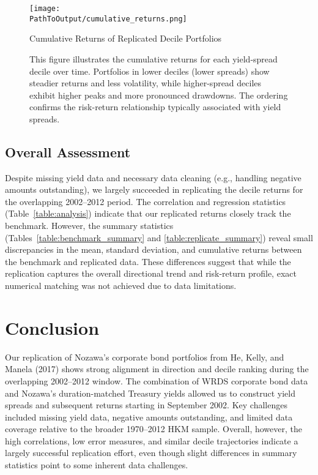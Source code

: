 \documentclass[12pt]{article}
\begin{document}
\begin{figure}[H]
\centering
\texttt{[image: \\PathToOutput/cumulative\_returns.png]}
\caption{Cumulative Returns of Replicated Decile Portfolios}
\caption*{\footnotesize This figure illustrates the cumulative returns for each yield-spread decile over time. Portfolios in lower deciles (lower spreads) show steadier returns and less volatility, while higher-spread deciles exhibit higher peaks and more pronounced drawdowns. The ordering confirms the risk-return relationship typically associated with yield spreads.}
\label{fig:cumulative_returns}
\end{figure}

\subsection{Overall Assessment}
Despite missing yield data and necessary data cleaning (e.g., handling negative amounts outstanding), we largely succeeded in replicating the decile returns for the overlapping 2002--2012 period. The correlation and regression statistics (Table~\ref{table:analysis}) indicate that our replicated returns closely track the benchmark. However, the summary statistics (Tables~\ref{table:benchmark_summary} and \ref{table:replicate_summary}) reveal small discrepancies in the mean, standard deviation, and cumulative returns between the benchmark and replicated data. These differences suggest that while the replication captures the overall directional trend and risk-return profile, exact numerical matching was not achieved due to data limitations.

\section{Conclusion}
Our replication of Nozawa’s corporate bond portfolios from He, Kelly, and Manela (2017) shows strong alignment in direction and decile ranking during the overlapping 2002--2012 window. The combination of WRDS corporate bond data and Nozawa’s duration-matched Treasury yields allowed us to construct yield spreads and subsequent returns starting in September 2002. Key challenges included missing yield data, negative amounts outstanding, and limited data coverage relative to the broader 1970--2012 HKM sample. Overall, however, the high correlations, low error measures, and similar decile trajectories indicate a largely successful replication effort, even though slight differences in summary statistics point to some inherent data challenges.
\end{document}

